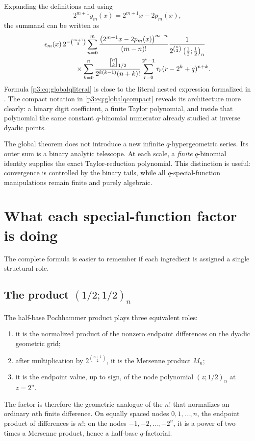 \documentclass[11pt,oneside]{article}
\theoremstyle{definition}
\theoremstyle{remark}
\newcommand{\qpoch}[3]{\left(#1;#2\right)_{#3}}
\newcommand{\halfqbinom}[2]{{\genfrac{[}{]}{0pt}{}{#1}{#2}}_{1/2}}
\newcommand{\tm}{\tau}
\begin{document}
Expanding the definitions and using
\[
 2^{m+1}y_m(x)=2^{m+1}x-2p_m(x),
\]
the summand can be written as
\begin{align}
&\epsilon_m(x)\,2^{-\binom{m+1}{2}}
\sum_{n=0}^{m}
 \frac{\bigl(2^{m+1}x-2p_m(x)\bigr)^{m-n}}{(m-n)!}
 \frac{1}{2^{\binom n2}\qpoch{\frac12}{\frac12}{n}}
 \notag\\[-0.2em]
&\hspace{4.5em}\times
 \sum_{k=0}^{n}
 \frac{\halfqbinom{n}{k}}
      {2^{k(k-1)}(n+k)!}
 \sum_{r=0}^{2^k-1}
 \tm_r(r-2^k+q)^{n+k}.
 \label{p3:eq:globalqliteral}
\end{align}
Formula \eqref{p3:eq:globalqliteral} is close to the literal nested expression
formalized in .  The compact
notation in \eqref{p3:eq:globalqcompact} reveals its architecture more clearly:
a binary digit coefficient, a finite Taylor polynomial, and inside that
polynomial the same constant $q$-binomial numerator already studied at
inverse dyadic points.

\begin{keybox}
The global theorem does not introduce a new infinite $q$-hypergeometric
series.  Its outer sum is a binary analytic telescope.  At each scale, a
\emph{finite} $q$-binomial identity supplies the exact Taylor-reduction
polynomial.  This distinction is useful: convergence is controlled by the
binary tails, while all $q$-special-function manipulations remain finite and
purely algebraic.
\end{keybox}

\section{What each special-function factor is doing}

The complete formula is easier to remember if each ingredient is assigned a
single structural role.

\subsection{The product \texorpdfstring{$\qpoch{1/2}{1/2}{n}$}{(1/2;1/2)[n]}}

The half-base Pochhammer product plays three equivalent roles:
\begin{enumerate}[leftmargin=2.2em]
\item it is the normalized product of the nonzero endpoint differences on
the dyadic geometric grid;
\item after multiplication by $2^{\binom{n+1}{2}}$, it is the Mersenne
product $M_n$;
\item it is the endpoint value, up to sign, of the node polynomial
$\qpoch{z}{1/2}{n}$ at $z=2^n$.
\end{enumerate}
The factor is therefore the geometric analogue of the $n!$ that normalizes
an ordinary $n$th finite difference.  On equally spaced nodes
$0,1,\ldots,n$, the endpoint product of differences is $n!$; on the nodes
$-1,-2,\ldots,-2^n$, it is a power of two times a Mersenne product, hence a
half-base $q$-factorial.
\end{document}
